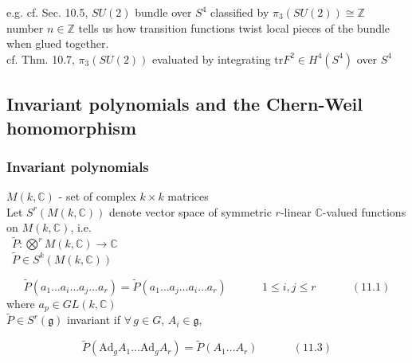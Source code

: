 \documentclass[twoside]{amsart}
\begin{document}

e.g. cf. Sec. 10.5, $SU(2)$ bundle over $S^4$ classified by $\pi_3(SU(2)) \cong \mathbb{Z}$ \\
number $n \in \mathbb{Z}$ tells us how transition functions twist local pieces of the bundle when glued together.  \\
cf. Thm. 10.7, $\pi_3(SU(2))$ evaluated by integrating $\text{tr}{ F^2} \in H^4(S^4)$ over $S^4$


\subsection{Invariant polynomials and the Chern-Weil homomorphism }





\subsubsection{Invariant polynomials}

$M(k,\mathbb{C})$ - set of complex $k\times k$ matrices  \\

Let $S^r(M(k,\mathbb{C}))$ denote vector space of symmetric $r$-linear $\mathbb{C}$-valued functions on $M(k,\mathbb{C})$, i.e. \\
\quad \quad \, $\widetilde{P}: \bigotimes^r M(k,\mathbb{C}) \to \mathbb{C}$ \\
\quad \quad \quad \, $\widetilde{P} \in S^k(M(k,\mathbb{C}))$ 

\begin{equation}
  \widetilde{P}{ (a_1 \dots a_i \dots a_j \dots a_r ) } =\widetilde{ P}{ (a_1 \dots a_j \dots a_i \dots a_r) } \quad \quad \quad \, 1\leq i , j \leq r \quad \quad \quad \, (11.1)
\end{equation}
where $a_p \in GL(k,\mathbb{C})$ \\

$\widetilde{P} \in S^r(\mathfrak{g})$ invariant if $\forall \, g \in G$, $A_i \in \mathfrak{g}$, 

\begin{equation}
  \widetilde{P}{ (\text{Ad}_g{A_1} \dots \text{Ad}_g{A_r})} = \widetilde{P}(A_1 \dots A_r) \quad \quad \quad \, (11.3)
\end{equation}
\end{document}
